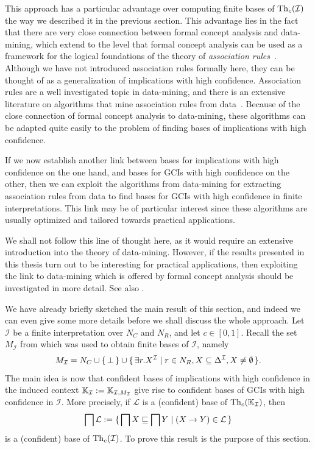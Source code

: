 This approach has a particular advantage over computing finite bases of
$\operatorname{Th}_c(\mathcal{I})$ the way we described it in the previous section.  This advantage lies
in the fact that there are very close connection between formal concept analysis and
data-mining, which extend to the level that formal concept analysis can be used as a
framework for the logical foundations of the theory of \emph{association
  rules}~\cite{arules:Zaki:1998}.  Although we have not introduced association rules
formally here, they can be thought of as a generalization of implications with high
confidence.  Association rules are a well investigated topic in data-mining, and there is
an extensive literature on algorithms that mine association rules from data~.  Because of the close connection of formal concept analysis to
data-mining, these algorithms can be adapted quite easily to the problem of finding bases
of implications with high confidence.

If we now establish another link between bases for implications with high confidence on
the one hand, and bases for GCIs with high confidence on the other, then we can exploit
the algorithms from data-mining for extracting association rules from data to find bases
for GCIs with high confidence in finite interpretations.  This link may be of particular
interest since these algorithms are usually optimized and tailored towards practical
applications.

We shall not follow this line of thought here, as it would require an extensive
introduction into the theory of data-mining.  However, if the results presented in this
thesis turn out to be interesting for practical applications, then exploiting the link to
data-mining which is offered by formal concept analysis should be investigated in more
detail.  See also .

We have already briefly sketched the main result of this section, and indeed we can even
give some more details before we shall discuss the whole approach.  Let $\mathcal{I}$ be a
finite interpretation over $N_C$ and $N_R$, and let $c \in [0,1]$.  Recall the set
$M_{\mathcal{I}}$ from  which was used to obtain finite bases of
$\mathcal{I}$, namely
\begin{equation*}
  M_{\mathcal{I}} = N_C \cup {\ensuremath{\{\, \bot \,\}}} \cup {\ensuremath{\{\, \exists r. X^{\mathcal{I}} \mid r \in
    N_R, X \subseteq \Delta^{\mathcal{I}}, X \neq \emptyset \,\}}}.
\end{equation*}
The main idea is now that confident bases of implications with high confidence in the
induced context ${\mathbb{K}}_{\mathcal{I}} := {\mathbb{K}}_{\mathcal{I}, M_{\mathcal{I}}}$ give rise
to confident bases of GCIs with high confidence in $\mathcal{I}$.  More precisely, if
$\mathcal{L}$ is a (confident) base of $\operatorname{Th}_c({\mathbb{K}}_{\mathcal{I}})$, then
\begin{equation*}
  \bigsqcap \mathcal{L} := {\{\, \bigsqcap X \sqsubseteq \bigsqcap Y \mid (X \to Y) \in
    \mathcal{L} \,\}}
\end{equation*}
is a (confident) base of $\operatorname{Th}_c(\mathcal{I})$.  To prove this result is the purpose of
this section.

